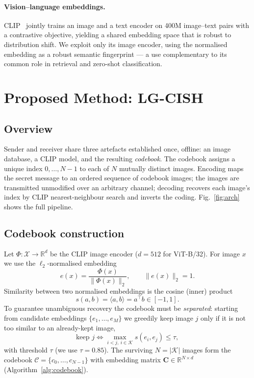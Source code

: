 \documentclass[10pt]{article}
\begin{document}
\paragraph{Vision--language embeddings.}
CLIP~\cite{radford2021} jointly trains an image and a text encoder on 400M
image--text pairs with a contrastive objective, yielding a shared embedding space
that is robust to distribution shift. We exploit only its image encoder, using
the normalised embedding as a robust semantic fingerprint --- a use complementary
to its common role in retrieval and zero-shot classification.

\section{Proposed Method: LG-CISH}\label{sec:method}
\subsection{Overview}
Sender and receiver share three artefacts established once, offline: an image
database, a CLIP model, and the resulting \emph{codebook}. The codebook assigns a
unique index $0,\dots,N-1$ to each of $N$ mutually distinct images. Encoding maps
the secret message to an ordered sequence of codebook images; the images are
transmitted unmodified over an arbitrary channel; decoding recovers each image's
index by CLIP nearest-neighbour search and inverts the coding.
Fig.~\ref{fig:arch} shows the full pipeline.


\subsection{Codebook construction}\label{sec:codebook}
Let $\Phi:\mathcal{X}\!\to\!\mathbb{R}^{d}$ be the CLIP image encoder
($d{=}512$ for ViT-B/32). For image $x$ we use the $\ell_2$-normalised embedding
\begin{equation}
  e(x)=\frac{\Phi(x)}{\lVert\Phi(x)\rVert_2}, \qquad \lVert e(x)\rVert_2=1 .
  \label{eq:embed}
\end{equation}
Similarity between two normalised embeddings is the cosine (inner) product
\begin{equation}
  s(a,b)=\langle a,b\rangle=a^{\!\top}b\in[-1,1].
  \label{eq:cos}
\end{equation}
To guarantee unambiguous recovery the codebook must be \emph{separated}: starting
from candidate embeddings $\{e_1,\dots,e_M\}$ we greedily keep image $j$ only if
it is not too similar to an already-kept image,
\begin{equation}
  \text{keep } j \iff \max_{i<j,\ i\in\mathcal{K}} s(e_i,e_j)\le\tau ,
  \label{eq:prune}
\end{equation}
with threshold $\tau$ (we use $\tau{=}0.85$). The surviving $N{=}|\mathcal{K}|$
images form the codebook $\mathcal{C}=\{c_0,\dots,c_{N-1}\}$ with embedding matrix
$\mathbf{C}\in\mathbb{R}^{N\times d}$ (Algorithm~\ref{alg:codebook}).
\end{document}
